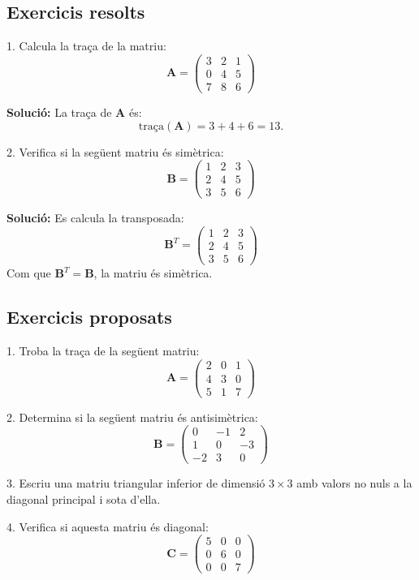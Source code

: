 \documentclass[12pt]{article}
\newcommand{\mat}[1]{\mathbf{#1}}
\begin{document}
\subsection*{Exercicis resolts}
\begin{exercici}
1. Calcula la traça de la matriu:
\[
\mat{A} = \begin{pmatrix}
3 & 2 & 1 \\
0 & 4 & 5 \\
7 & 8 & 6
\end{pmatrix}
\]

\textbf{Solució:}
La traça de $\mat{A}$ és:
\[
\text{traça}(\mat{A}) = 3 + 4 + 6 = 13.
\]

2. Verifica si la següent matriu és simètrica:
\[
\mat{B} = \begin{pmatrix}
1 & 2 & 3 \\
2 & 4 & 5 \\
3 & 5 & 6
\end{pmatrix}
\]

\textbf{Solució:}
Es calcula la transposada:
\[
\mat{B}^T = \begin{pmatrix}
1 & 2 & 3 \\
2 & 4 & 5 \\
3 & 5 & 6
\end{pmatrix}
\]
Com que $\mat{B}^T = \mat{B}$, la matriu és simètrica.
\end{exercici}

\subsection*{Exercicis proposats}
\begin{exercici}
1. Troba la traça de la següent matriu:
\[
\mat{A} = \begin{pmatrix}
2 & 0 & 1 \\
4 & 3 & 0 \\
5 & 1 & 7
\end{pmatrix}
\]

2. Determina si la següent matriu és antisimètrica:
\[
\mat{B} = \begin{pmatrix}
0 & -1 & 2 \\
1 & 0 & -3 \\
-2 & 3 & 0
\end{pmatrix}
\]

3. Escriu una matriu triangular inferior de dimensió $3 \times 3$ amb valors no nuls a la diagonal principal i sota d'ella.

4. Verifica si aquesta matriu és diagonal:
\[
\mat{C} = \begin{pmatrix}
5 & 0 & 0 \\
0 & 6 & 0 \\
0 & 0 & 7
\end{pmatrix}
\]
\end{exercici}
\end{document}
